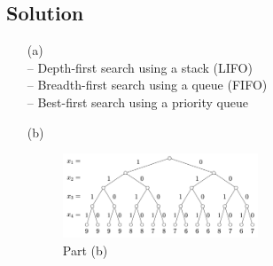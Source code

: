 \documentclass{article}
\begin{document}
\color{blue}
\subsection*{Solution}
\begin{itemize}
\item[(a)] \ \\
– Depth-first search using a stack (LIFO)\\
– Breadth-first search using a queue (FIFO)\\ 
– Best-first search using a priority queue\\
%
%



\item[(b)] 
\begin{figure}[h]
    \centering
	\includegraphics[width=0.55\textwidth]{SearchTree.png}
	\caption{Part (b)}
\end{figure}


\end{itemize}
\end{document}
